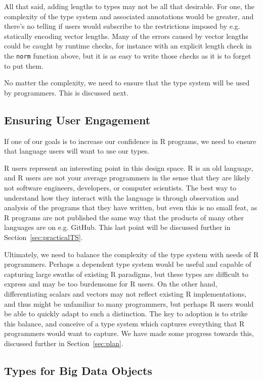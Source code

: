 \documentclass[sigplan,10pt,review,anonymous]{acmart}\settopmatter{printfolios=true,printccs=false,printacmref=false}
\begin{document}
All that said, adding lengths to types may not be all that desirable.
For one, the complexity of the type system and associated annotations would be greater, and there's no telling if users would subscribe to the restrictions imposed by e.g. statically encoding vector lengths.
Many of the errors caused by vector lengths could be caught by runtime checks, for instance with an explicit length check in the {\tt norm} function above, but it is as easy to write those checks as it is to forget to put them.

No matter the complexity, we need to ensure that the type system will be used by programmers.
This is discussed next.

%
%
\subsection{Ensuring User Engagement}

If one of our goals is to increase our confidence in R programs, we need to ensure that language users will want to use our types.

R users represent an interesting point in this design space.
R is an old language, and R users are not your average programmers in the sense that they are likely not software engineers, developers, or computer scientists.
The best way to understand how they interact with the language is through observation and analysis of the programs that they have written, but even this is no small feat, as R programs are not published the same way that the products of many other languages are on e.g. GitHub.
This last point will be discussed further in Section~\ref{sec:practicalTS}.

Ultimately, we need to balance the complexity of the type system with needs of R programmers.
Perhaps a dependent type system would be useful and capable of capturing large swaths of existing R paradigms, but these types are difficult to express and may be too burdensome for R users. 
On the other hand, differentiating scalars and vectors may not reflect existing R implementations, and thus might be unfamiliar to many programmers, but perhaps R users would be able to quickly adapt to such a distinction.
The key to adoption is to strike this balance, and conceive of a type system which captures everything that R programmers would want to capture. 
We have made some progress towards this, discussed further in Section~\ref{sec:plan}.

%
%
\subsection{Types for Big Data Objects}
\end{document}
